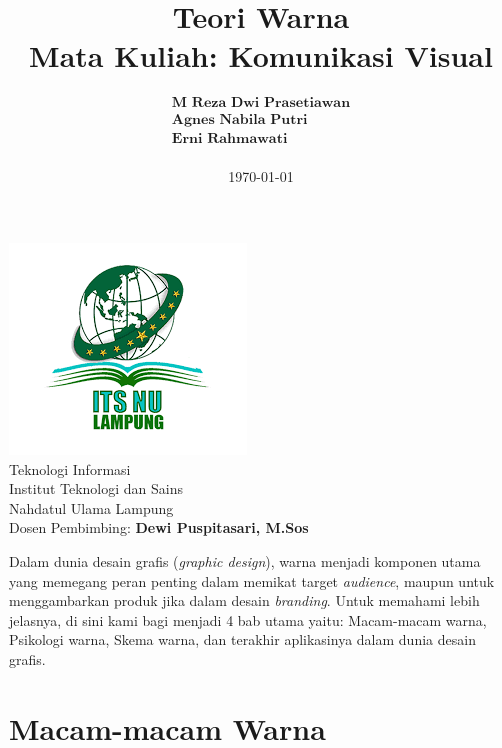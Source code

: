 \documentclass[a4paper,12pt]{article}
\title{
  \vspace{-3cm}
  \centering
  \vspace{1cm}
  \textbf{Teori Warna}\\
  \large Mata Kuliah: \textbf{Komunikasi Visual}
}
\author{$\begin{array}{c}
  \textbf{M Reza Dwi Prasetiawan}\\
  \textbf{Agnes Nabila Putri}\\
  \textbf{Erni Rahmawati}\\
\end{array}$
}
\date{\today}
\begin{document}
\begin{titlepage}
  \maketitle
  \vfill
  \begin{center}
    \includegraphics[width=\textwidth]{resources/logo.png}\\
    \large
    Teknologi Informasi\\
    Institut Teknologi dan Sains\\
    Nahdatul Ulama Lampung\\
    Dosen Pembimbing: \textbf{Dewi Puspitasari, M.Sos}
  \end{center}
\end{titlepage}

\newpage
{}
\tableofcontents
\newpage

Dalam dunia desain grafis (\textit{graphic design}), warna menjadi komponen utama yang memegang peran penting dalam memikat target \textit{audience}, maupun untuk menggambarkan produk jika dalam desain \textit{branding}. Untuk memahami lebih jelasnya, di sini kami bagi menjadi 4 bab utama yaitu: Macam-macam warna, Psikologi warna, Skema warna, dan terakhir aplikasinya dalam dunia desain grafis.

\section{Macam-macam Warna}
\end{document}
